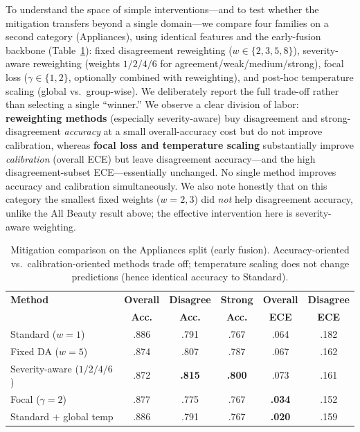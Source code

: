 \documentclass[11pt,a4paper]{article}
\begin{document}
To understand the space of simple interventions---and to test whether the mitigation transfers beyond a single domain---we compare four families on a second category (Appliances), using identical features and the early-fusion backbone (Table~\ref{tab:mitigation}): fixed disagreement reweighting ($w\in\{2,3,5,8\}$), severity-aware reweighting (weights $1/2/4/6$ for agreement/weak/medium/strong), focal loss ($\gamma\in\{1,2\}$, optionally combined with reweighting), and post-hoc temperature scaling (global vs.\ group-wise).
We deliberately report the full trade-off rather than selecting a single ``winner.''
We observe a clear division of labor: \textbf{reweighting methods} (especially severity-aware) buy disagreement and strong-disagreement \emph{accuracy} at a small overall-accuracy cost but do not improve calibration, whereas \textbf{focal loss and temperature scaling} substantially improve \emph{calibration} (overall ECE) but leave disagreement accuracy---and the high disagreement-subset ECE---essentially unchanged.
No single method improves accuracy and calibration simultaneously.
We also note honestly that on this category the smallest fixed weights ($w=2,3$) did \emph{not} help disagreement accuracy, unlike the All Beauty result above; the effective intervention here is severity-aware weighting.

\begin{table}[htbp]
\centering
\small
\caption{Mitigation comparison on the Appliances split (early fusion). Accuracy-oriented vs.\ calibration-oriented methods trade off; temperature scaling does not change predictions (hence identical accuracy to Standard).}
\label{tab:mitigation}
\begin{tabular}{lccccc}
\toprule
\textbf{Method} & \textbf{Overall} & \textbf{Disagree} & \textbf{Strong} & \textbf{Overall} & \textbf{Disagree} \\
 & \textbf{Acc.} & \textbf{Acc.} & \textbf{Acc.} & \textbf{ECE} & \textbf{ECE} \\
\midrule
Standard ($w{=}1$)          & .886 & .791 & .767 & .064 & .182 \\
Fixed DA ($w{=}5$)          & .874 & .807 & .787 & .067 & .162 \\
Severity-aware ($1/2/4/6$)  & .872 & \textbf{.815} & \textbf{.800} & .073 & .161 \\
Focal ($\gamma{=}2$)        & .877 & .775 & .767 & \textbf{.034} & .152 \\
Standard $+$ global temp    & .886 & .791 & .767 & \textbf{.020} & .159 \\
\bottomrule
\end{tabular}
\end{table}
\end{document}
